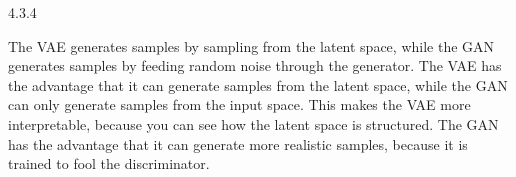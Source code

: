 \begin{task}{4.3.4}
\end{task}

The VAE generates samples by sampling from the latent space, while the GAN generates samples by
feeding random noise through the generator. The VAE has the advantage that it can generate samples
from the latent space, while the GAN can only generate samples from the input space. This makes the
VAE more interpretable, because you can see how the latent space is structured. The GAN has the
advantage that it can generate more realistic samples, because it is trained to fool the
discriminator.